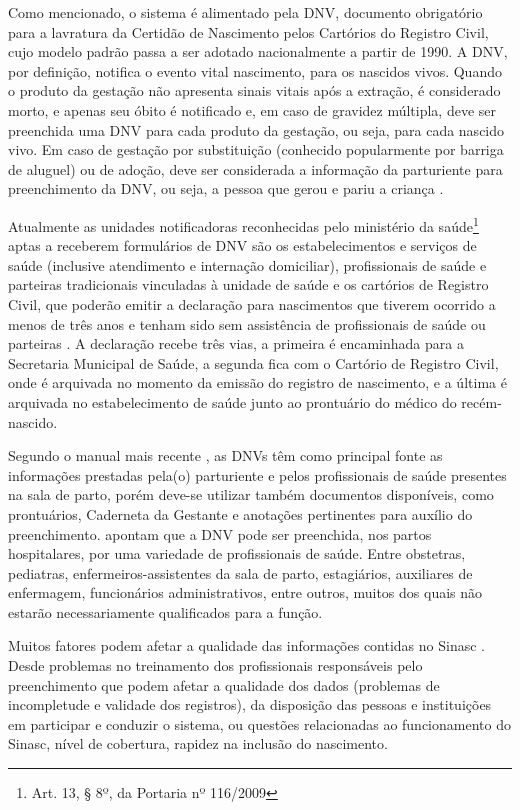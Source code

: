 Como mencionado, o sistema é alimentado pela DNV, documento obrigatório para a lavratura da Certidão de Nascimento pelos Cartórios do Registro Civil, cujo modelo padrão passa a ser adotado nacionalmente a partir de 1990. A DNV, por definição, notifica o evento vital nascimento, para os nascidos vivos. Quando o produto da gestação não apresenta sinais vitais após a extração, é considerado morto, e apenas seu  óbito é notificado e, em caso de gravidez múltipla, deve ser preenchida uma DNV para cada produto da gestação, ou seja, para cada nascido vivo. Em caso de gestação por substituição (conhecido popularmente por barriga de aluguel) ou de adoção, deve ser considerada a informação da parturiente para preenchimento da DNV, ou seja, a pessoa que gerou e pariu a criança \cite{BRmanualDNV2022}.

Atualmente as unidades notificadoras reconhecidas pelo ministério da saúde\footnote{Art. 13, § 8º, da Portaria nº 116/2009} aptas a receberem formulários de DNV são os estabelecimentos e serviços de saúde (inclusive atendimento e internação domiciliar), profissionais de saúde e parteiras tradicionais vinculadas à unidade de saúde e os cartórios de Registro Civil, que poderão emitir a declaração para nascimentos que tiverem ocorrido a menos de três anos e tenham sido sem assistência de profissionais de saúde ou parteiras \cite{BRmanualDNV2022}. A declaração recebe três vias, a primeira é encaminhada para a Secretaria Municipal de Saúde, a segunda fica com o Cartório de Registro Civil, onde é arquivada no momento da emissão do registro de nascimento, e a última é arquivada no estabelecimento de saúde junto ao prontuário do médico do recém-nascido. 

Segundo o manual mais recente \cite{BRmanualDNV2022}, as DNVs têm como principal fonte as informações prestadas pela(o) parturiente e pelos profissionais de saúde presentes na sala de parto, porém deve-se utilizar também documentos disponíveis, como prontuários, Caderneta da Gestante e anotações pertinentes para auxílio do preenchimento.  apontam que a DNV pode ser preenchida, nos partos hospitalares, por uma variedade de profissionais de saúde. Entre obstetras, pediatras, enfermeiros-assistentes da sala de parto, estagiários, auxiliares de enfermagem, funcionários administrativos, entre outros, muitos dos quais não estarão necessariamente qualificados para a função. 

Muitos fatores podem afetar a qualidade das informações contidas no Sinasc \cite{bonilha2018cobertura}. Desde problemas no treinamento dos profissionais responsáveis pelo preenchimento que podem afetar a qualidade dos dados (problemas de incompletude e validade dos registros), da disposição das pessoas e instituições em participar e conduzir o sistema, ou questões relacionadas ao funcionamento do Sinasc, nível de cobertura, rapidez na inclusão do nascimento.

